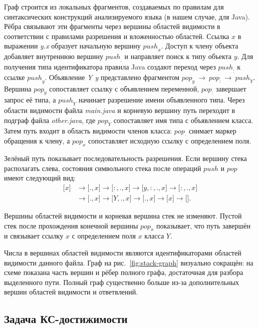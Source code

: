 Граф строится из локальных фрагментов, создаваемых по правилам для синтаксических конструкций анализируемого языка (в нашем случае, для Java). Рёбра связывают эти фрагменты через вершины областей видимости в соответствии с правилами разрешения и вложенностью областей. Ссылка \(x\) в выражении \emph{y.x} образует начальную вершину \({push}_{x}\). Доступ к члену объекта добавляет внутреннюю вершину \({push}_{.}\) и направляет поиск к типу объекта \(y\). Для получения типа идентификатора правила Java создают переход через \({push}_{:}\) к ссылке \({push}_{y}\). Объявление \emph{Y y} представлено фрагментом \({pop}_{y}\  \rightarrow \ {pop}_{:}\  \rightarrow \ {push}_{Y}\). Вершина \({pop}_{y}\) сопоставляет ссылку с объявлением переменной, \({pop}_{:}\) завершает запрос её типа, а \({push}_{Y}\) начинает разрешение имени объявленного типа. Через области видимости файла \emph{main.java} и корневую вершину путь переходит в подграф файла \emph{other.java}, где \({pop}_{Y}\) сопоставляет имя типа с объявлением класса. Затем путь входит в область видимости членов класса: \({pop}_{.}\) снимает маркер обращения к члену, а \({pop}_{x}\) сопоставляет исходную ссылку с определением поля.

Зелёный путь показывает последовательность разрешения. Если вершину стека располагать слева, состояния символьного стека после операций \(push\) и \(pop\) имеют следующий вид:
\[
\begin{aligned}
\lbrack x\rbrack &\to \lbrack.,x\rbrack \to \lbrack:,.,x\rbrack
  \to \lbrack y,:,.,x\rbrack \to \lbrack:,.,x\rbrack \\
&\to \lbrack.,x\rbrack \to \lbrack Y,.,x\rbrack
  \to \lbrack.,x\rbrack \to \lbrack x\rbrack \to \lbrack\rbrack .
\end{aligned}
\]

Вершины областей видимости и корневая вершина стек не изменяют. Пустой стек после прохождения конечной вершины \({pop}_{x}\) показывает, что путь завершён и связывает ссылку \(x\) с определением поля \(x\) класса \(Y\).

Числа в вершинах областей видимости являются идентификаторами областей видимости данного файла. Граф на рис.~\ref{fig:stack-graph} визуально сокращён: на схеме показана часть вершин и рёбер полного графа, достаточная для разбора выделенного пути. Полный граф существенно больше из-за дополнительных вершин областей видимости и ответвлений.

\subsection{Задача КС-достижимости}\label{sec:cfl-reachability}

